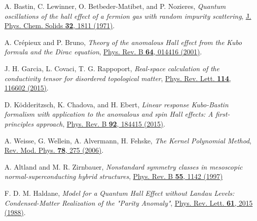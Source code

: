 \documentclass[aps,prl,amsmath,amssymb,twocolumn, superscriptaddress]{revtex4-2}
\begin{document}
\begin{thebibliography}{10}
A. Bastin, C. Lewinner, O. Betbeder-Matibet, and P.
Nozieres, {\em Quantum oscillations of the hall effect of a fermion gas with random impurity scattering}, \href{https://www.sciencedirect.com/science/article/pii/S0022369771801476}{ J. Phys. Chem. Solids {\bfseries 32}, 1811 (1971)}.

A. Cr\'epieux and P. Bruno, {\em Theory of the anomalous Hall effect from the Kubo formula and the Dirac equation}, \href{https://journals.aps.org/prb/abstract/10.1103/PhysRevB.64.014416}{Phys. Rev. B {\bfseries 64}, 014416 (2001)}.

J. H. Garcia, L.  Covaci, T. G. Rappoport, {\em Real-space calculation of the conductivity tensor for disordered topological matter}, \href{https://journals.aps.org/prl/abstract/10.1103/PhysRevLett.114.116602}{Phys. Rev. Lett. {\bfseries 114}, 116602 (2015)}.

D. Ködderitzsch, K. Chadova, and H. Ebert, {\em Linear response Kubo-Bastin formalism with application to the anomalous and spin Hall effects: A first-principles approach}, \href{https://journals.aps.org/prb/abstract/10.1103/PhysRevB.92.184415}{Phys. Rev. B {\bfseries 92}, 184415 (2015)}.

A. Weisse, G. Wellein, A. Alvermann, H. Fehske, {\em The Kernel Polynomial Method}, \href{https://journals.aps.org/rmp/abstract/10.1103/RevModPhys.78.275}{Rev. Mod. Phys. {\bfseries 78}, 275 (2006)}.

A. Altland and M. R. Zirnbauer, {\em Nonstandard symmetry classes in mesoscopic normal-superconducting hybrid structures}, \href{https://journals.aps.org/prb/abstract/10.1103/PhysRevB.55.1142}{Phys. Rev. B {\bfseries 55}, 1142 (1997)}

F. D. M. Haldane, {\em Model for a Quantum Hall Effect without Landau Levels: Condensed-Matter Realization of the "Parity Anomaly"}, \href{https://journals.aps.org/prl/abstract/10.1103/PhysRevLett.61.2015}{Phys. Rev. Lett. {\bfseries 61}, 2015 (1988)}.

\end{thebibliography}
\end{document}
